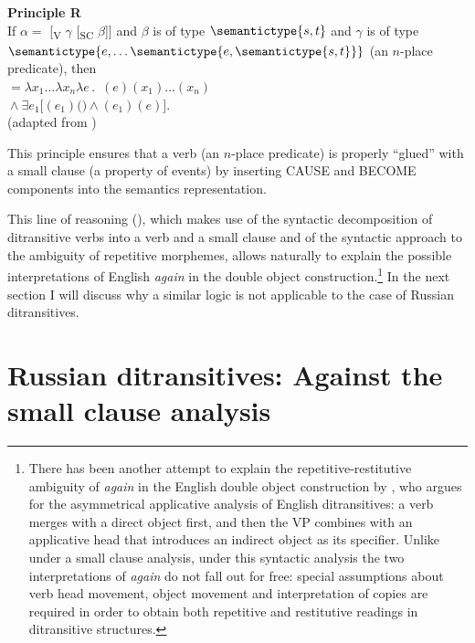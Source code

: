 \documentclass[output=paper]{langscibook}
\begin{document}
\ea \textbf{Principle R}\\
     If $\alpha ={}$ [\textsubscript{V} $\gamma$ [\textsubscript{SC} $\beta$]] and $\beta$ is of type $\semantictype{s,t}$ and $\gamma$ is of type $\semantictype{e,\dots\semantictype{e,\semantictype{s,t}}}$ (an $n$-place predicate), then\\\sx{$\alpha$}${}=\lambda x_1\dots\lambda x_n\lambda e\,.\,$ \sx{$\gamma $}$(e)(x_1)\dots(x_n)$\\
     \tabto{1cm}${}\wedge\exists e_1[$$(e_1)($\sx{$\beta$}$)\wedge{}$$(e_1)(e)]$.\\
     \hfill (adapted from \citealt[7]{Beck2005})
     \z


\noindent This principle ensures that a verb (an $n$-place predicate) is properly “glued” with a small clause (a property of events) by inserting CAUSE and BECOME components into the semantics representation.

This line of reasoning (\citealt{Beck-Johnson2004}), which makes use of the syntactic decomposition of ditransitive verbs into a verb and a small clause and of the syntactic approach to the ambiguity of repetitive morphemes, allows naturally to explain the possible interpretations of English \textit{again} in the double object construction.\footnote{There has been another attempt to explain the repetitive-restitutive ambiguity of \textit{again} in the English double object construction by \citet{Bruening2010}, who argues for the asymmetrical applicative analysis of English ditransitives: a verb merges with a direct object first, and then the VP combines with an applicative head that introduces an indirect object as its specifier. Unlike under a small clause analysis, under this syntactic analysis the two interpretations of \textit{again} do not fall out for free: special assumptions about verb head movement, object movement and interpretation of copies are required in order to obtain both repetitive and restitutive readings in ditransitive structures.} In the next section I will discuss why a similar logic is not applicable to the case of Russian ditransitives.


\section{Russian ditransitives: Against the small clause analysis}\label{s3}
\end{document}
